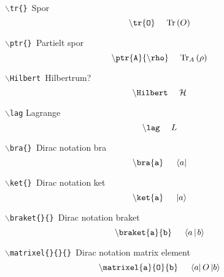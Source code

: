 \documentclass[a4paper,hidelinks,11pt]{memoir}
\begin{document}
\texttt{$\backslash$tr\{\} }Spor
$$
\mathtt{\backslash tr\{ O\} }~~~~\text{Tr}\left(O\right)
$$

\texttt{$\backslash$ptr\{\} }Partielt spor
$$
\mathtt{\backslash ptr\{ A\}\{ \backslash rho\} }~~~~\text{Tr}_{A}\left(\rho\right)
$$

\texttt{$\backslash$Hilbert }Hilbertrum?
$$
\mathtt{\backslash Hilbert}~~~~\mathcal{H}
$$

\texttt{$\backslash$lag} Lagrange
$$
\mathtt{\backslash lag}~~~~{L}
$$

\texttt{$\backslash$bra\{\} }Dirac notation bra
$$
\mathtt{\backslash bra\{ a\}}~~~~\left< a \right|
$$

\texttt{$\backslash$ket\{\} }Dirac notation ket
$$
\mathtt{\backslash ket\{ a\}}~~~~\left| a \right>
$$

\texttt{$\backslash$braket\{\}\{\} }Dirac notation braket
$$
\mathtt{\backslash braket\{ a\}\{ b\}}~~~~\braket{a}{b}
$$

\texttt{$\backslash$matrixel\{\}\{\}\{\} }Dirac notation matrix element
$$
\mathtt{\backslash matrixel\{ a\}\{ O\}\{ b\}}~~~~\matrixel{a}{O}{b}
$$
\end{document}
